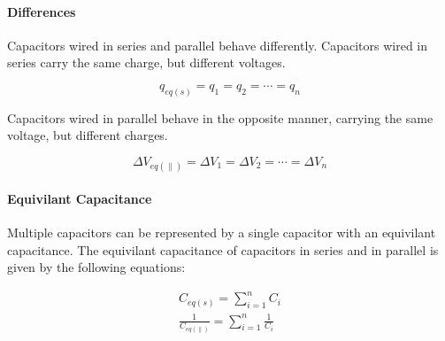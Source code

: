 \paragraph*{Differences}
Capacitors wired in series and parallel behave differently. Capacitors wired in series carry the same charge, but different voltages.

\begin{equation*}
    q_{eq(s)} = q_1 = q_2 = \cdots = q_n
\end{equation*}

Capacitors wired in parallel behave in the opposite manner, carrying the same voltage, but different charges.

\begin{equation*}
    \Delta V_{eq(\parallel)} = \Delta V_1 = \Delta V_2 = \cdots = \Delta V_n
\end{equation*}
    

\paragraph*{Equivilant Capacitance}
Multiple capacitors can be represented by a single capacitor with an equivilant capacitance. The equivilant capacitance of 
capacitors in series and in parallel is given by the following equations:

\begin{align*}
    C_{eq(s)} = \sum_{i=1}^{n} C_i\\
    \frac{1}{C_{eq(\parallel)}} = \sum_{i=1}^{n} \frac{1}{C_i} 
\end{align*}



